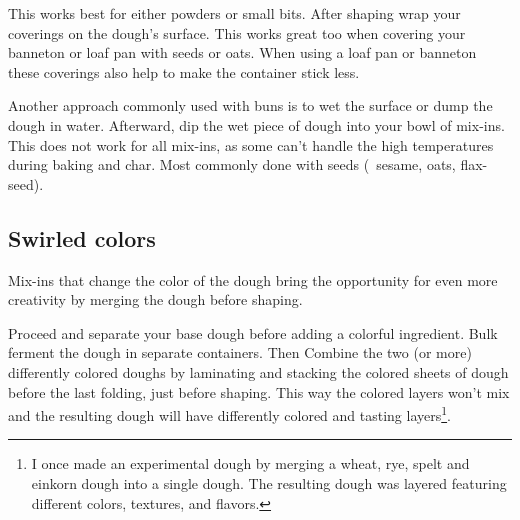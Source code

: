This works best for either powders or small bits. After shaping wrap your
coverings on the dough's surface. This works great too when covering your
banneton or loaf pan with seeds or oats. When using a loaf pan or banneton
these coverings also help to make the container stick less.

Another approach commonly used with buns is to wet the surface or dump the
dough in water. Afterward, dip the wet piece of dough into your bowl of
mix-ins.  This does not work for all mix-ins, as some can't handle the high
temperatures during baking and char. Most commonly done with seeds
(\eg~sesame, oats, flax-seed).

\subsection{Swirled colors}
Mix-ins that change the color of the dough bring the opportunity for even more
creativity by merging the dough before shaping.

Proceed and separate your base dough before adding a colorful ingredient. Bulk
ferment the dough in separate containers. Then Combine the two (or
more) differently colored doughs by laminating and stacking the colored sheets
of dough before the last folding, just before shaping. This way the colored
layers won't mix and the resulting dough will have differently colored and
tasting layers\footnote{I once made an experimental dough by merging a wheat,
rye, spelt and einkorn dough into a single dough. The resulting dough was
layered featuring different colors, textures, and flavors.}.
